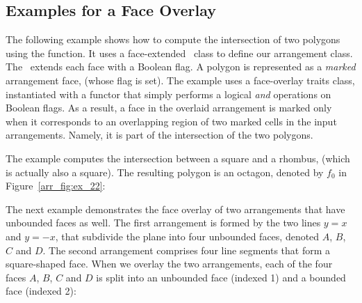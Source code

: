 
\subsection{Examples for a Face Overlay\label{arr_ssec:face_ovl}}

The following example shows how to compute the intersection of two polygons
using the  function. It uses a face-extended \dcel\ class
to define our arrangement class. The \dcel\ extends each face with a Boolean 
flag. A polygon is represented as a {\sl marked} arrangement face, (whose
flag is set). The example uses a face-overlay traits class, instantiated with 
a functor that simply performs a logical {\em and} operations on Boolean flags.
As a result, a face in the overlaid arrangement is marked only when it
corresponds to an overlapping region of two marked cells in the input
arrangements. Namely, it is part of the intersection of the two polygons.

The example computes the intersection between a square and a rhombus, (which is
actually also a square). The resulting polygon is an octagon, denoted
by $f_0$ in Figure~\ref{arr_fig:ex_22}:


The next example demonstrates the face overlay of two arrangements that
have unbounded faces as well. The first arrangement is formed by the two lines
$y = x$ and $y = -x$, that subdivide the plane into four unbounded faces,
denoted $A$, $B$, $C$ and $D$. The second arrangement comprises four line
segments that form a square-shaped face. When we overlay the two arrangements,
each of the four faces $A$, $B$, $C$ and $D$ is split into an unbounded
face (indexed 1) and a bounded face (indexed 2):

